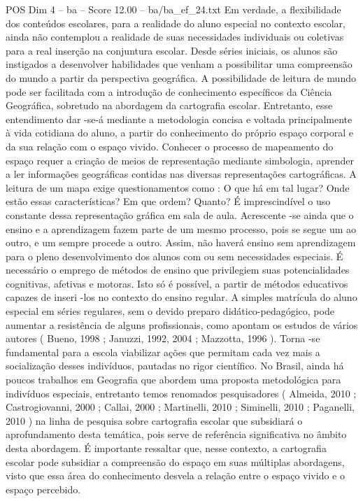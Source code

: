 \begin{textsample}{POS Dim 4 – ba – Score 12.00 – ba/ba\_ef\_24.txt}
Em verdade, a flexibilidade dos conteúdos escolares, para a realidade do aluno especial no contexto escolar, ainda não contemplou a realidade de suas necessidades individuais ou coletivas para a real inserção na conjuntura escolar.
Desde séries iniciais, os alunos são instigados a desenvolver habilidades que venham a possibilitar uma compreensão do mundo a partir da perspectiva geográfica.
A possibilidade de leitura de mundo pode ser facilitada com a introdução de conhecimento específicos da Ciência Geográfica, sobretudo na abordagem da cartografia escolar.
Entretanto, esse entendimento dar -se-á mediante a metodologia concisa e voltada principalmente à vida cotidiana do aluno, a partir do conhecimento do próprio espaço corporal e da sua relação com o espaço vivido.
Conhecer o processo de mapeamento do espaço requer a criação de meios de representação mediante simbologia, aprender a ler informações geográficas contidas nas diversas representações cartográficas.
A leitura de um mapa exige questionamentos como : O que há em tal lugar?
Onde estão essas características?
Em que ordem?
Quanto?
É imprescindível o uso constante dessa representação gráfica em sala de aula.
Acrescente -se ainda que o ensino e a aprendizagem fazem parte de um mesmo processo, pois se segue um ao outro, e um sempre procede a outro.
Assim, não haverá ensino sem aprendizagem para o pleno desenvolvimento dos alunos com ou sem necessidades especiais.
É necessário o emprego de métodos de ensino que privilegiem suas potencialidades cognitivas, afetivas e motoras.
Isto só é possível, a partir de métodos educativos capazes de inseri -los no contexto do ensino regular.
A simples matrícula do aluno especial em séries regulares, sem o devido preparo didático-pedagógico, pode aumentar a resistência de alguns profissionais, como apontam os estudos de vários autores ( Bueno, 1998 ; Januzzi, 1992, 2004 ; Mazzotta, 1996 ).
Torna -se fundamental para a escola viabilizar ações que permitam cada vez mais a socialização desses indivíduos, pautadas no rigor científico.
No Brasil, ainda há poucos trabalhos em Geografia que abordem uma proposta metodológica para indivíduos especiais, entretanto temos renomados pesquisadores ( Almeida, 2010 ; Castrogiovanni, 2000 ; Callai, 2000 ; Martinelli, 2010 ; Siminelli, 2010 ; Paganelli, 2010 ) na linha de pesquisa sobre cartografia escolar que subsidiará o aprofundamento desta temática, pois serve de referência significativa no âmbito desta abordagem.
É importante ressaltar que, nesse contexto, a cartografia escolar pode subsidiar a compreensão do espaço em suas múltiplas abordagens, visto que essa área do conhecimento desvela a relação entre o espaço vivido e o espaço percebido.

\end{textsample}
